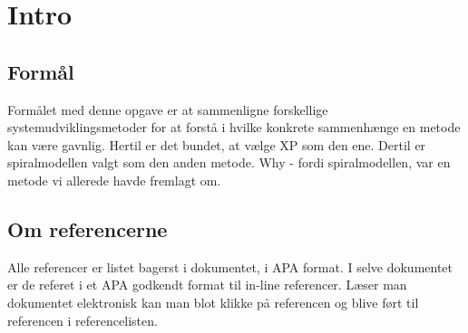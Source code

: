 \chapter{Intro}
\label{chapter:introduction}

\section{Formål}
\label{sec:case}
Formålet med denne opgave er at sammenligne forskellige systemudviklingsmetoder for at forstå
i hvilke konkrete sammenhænge en metode kan være gavnlig.
Hertil er det bundet, at vælge XP som den ene. Dertil er spiralmodellen valgt som den anden metode.
Why - fordi spiralmodellen, var en metode vi allerede havde fremlagt om.

\section{Om referencerne}
\label{sec:note}
Alle referencer er listet bagerst i dokumentet, i APA format. I selve dokumentet er de referet i et APA godkendt format til in-line referencer. Læser man dokumentet elektronisk kan man blot klikke på referencen og blive ført til referencen i referencelisten.